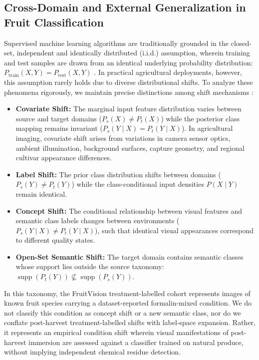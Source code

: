 \subsection{Cross-Domain and External Generalization in Fruit Classification}
\label{sec:cross_domain_generalization}

Supervised machine learning algorithms are traditionally grounded in the closed-set, independent and identically distributed (i.i.d.) assumption, wherein training and test samples are drawn from an identical underlying probability distribution: $P_{\text{train}}(X, Y) = P_{\text{test}}(X, Y)$ \cite{yang2024generalized}. In practical agricultural deployments, however, this assumption rarely holds due to diverse distributional shifts. To analyze these phenomena rigorously, we maintain precise distinctions among shift mechanisms \cite{yang2024generalized}:
\begin{itemize}
\item \textbf{Covariate Shift:} The marginal input feature distribution varies between source and target domains ($P_s(X) \ne P_t(X)$) while the posterior class mapping remains invariant ($P_s(Y \mid X) = P_t(Y \mid X)$). In agricultural imaging, covariate shift arises from variations in camera sensor optics, ambient illumination, background surfaces, capture geometry, and regional cultivar appearance differences.
\item \textbf{Label Shift:} The prior class distribution shifts between domains ($P_s(Y) \ne P_t(Y)$) while the class-conditional input densities $P(X \mid Y)$ remain identical.
\item \textbf{Concept Shift:} The conditional relationship between visual features and semantic class labels changes between environments ($P_s(Y \mid X) \ne P_t(Y \mid X)$), such that identical visual appearances correspond to different quality states.
\item \textbf{Open-Set Semantic Shift:} The target domain contains semantic classes whose support lies outside the source taxonomy: $\operatorname{supp}(P_t(Y)) \not\subseteq \operatorname{supp}(P_s(Y))$.
\end{itemize}

\noindent In this taxonomy, the FruitVision treatment-labelled cohort represents images of known fruit species carrying a dataset-reported formalin-mixed condition. We do not classify this condition as concept shift or a new semantic class, nor do we conflate post-harvest treatment-labelled shifts with label-space expansion. Rather, it represents an empirical condition shift wherein visual manifestations of post-harvest immersion are assessed against a classifier trained on natural produce, without implying independent chemical residue detection.

